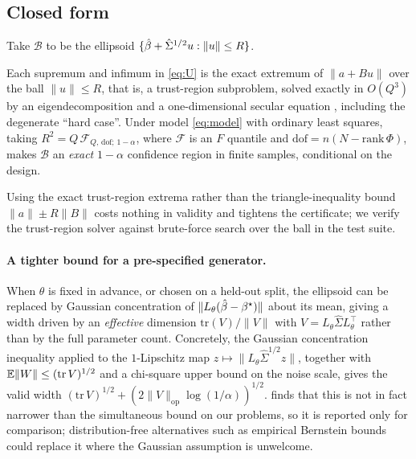 \subsection{Closed form}

Take $\mathcal B$ to be the ellipsoid $\{\hat{\beta} + \hat\Sigma^{1/2} u : \|u\|
\le R\}$.

\begin{proposition}
\label{prop:closedform}
Each supremum and infimum in \eqref{eq:U} is the exact extremum of
$\|a + Bu\|$ over the ball $\|u\|\le R$, that is, a trust-region subproblem,
solved exactly in $O(Q^3)$ by an eigendecomposition and a one-dimensional
secular equation \citep{gander1989constrained,more1983computing}, including the
degenerate ``hard case''. Under model \eqref{eq:model} with ordinary least
squares, taking $R^2 = Q\,\mathcal F_{Q,\,\mathrm{dof};\,1-\alpha}$, where
$\mathcal F$ is an $F$ quantile and $\mathrm{dof} = n(N-\mathrm{rank}\,\Phi)$,
makes $\mathcal B$ an \emph{exact} $1-\alpha$ confidence region in finite
samples, conditional on the design.
\end{proposition}

Using the exact trust-region extrema rather than the triangle-inequality bound
$\|a\| \pm R\|B\|$ costs nothing in validity and tightens the certificate; we
verify the trust-region solver against brute-force search over the ball in the
test suite.

\paragraph{A tighter bound for a pre-specified generator.} When $\theta$ is
fixed in advance, or chosen on a held-out split, the ellipsoid can be replaced
by Gaussian concentration of $\|L_\theta(\hat{\beta} - \beta^\star)\|$ about its
mean, giving a width driven by an \emph{effective} dimension
$\mathrm{tr}(V)/\|V\|$ with $V = L_\theta \hat\Sigma L_\theta^{\!\top}$ rather
than by the full parameter count. Concretely, the Gaussian concentration
inequality
\citep{borell1975brunn,cirelson1976norms,boucheron2013concentration} applied
to the $1$-Lipschitz map $z \mapsto \|L_\theta \hat\Sigma^{1/2} z\|$, together
with $\mathbb{E}\|W\| \le (\mathrm{tr}\,V)^{1/2}$ and a chi-square upper bound on the
noise scale, gives the valid width $(\mathrm{tr}\,V)^{1/2} +
(2\|V\|_{\mathrm{op}}\log(1/\alpha))^{1/2}$.  finds that
this is not in fact narrower than the simultaneous bound on our problems, so
it is reported only for comparison; distribution-free alternatives such as
empirical Bernstein bounds \citep{maurer2009empirical} could replace it where
the Gaussian assumption is unwelcome.

